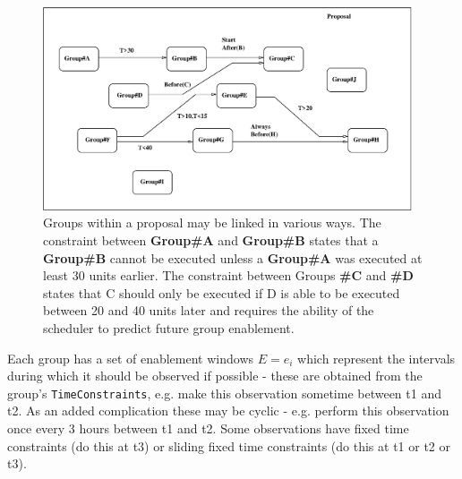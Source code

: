    \begin{figure}[h]
   \begin{center}
   \includegraphics[height=6cm]{figures/group_linking.eps}
   \end{center}
  
   \caption[Group Linking.] 
   {Groups within a proposal may be linked in various ways. The constraint between {\bf Group\#A} and {\bf Group\#B} states that a {\bf Group\#B} cannot be executed unless a {\bf Group\#A} was executed at least 30 units earlier. The constraint between Groups {\bf \#C} and {\bf \#D} states that C should only be executed if D is able to be executed between 20 and 40 units later and requires the ability of the scheduler to predict future group enablement.}
   \label{fig:group-linking} 
   \end{figure} 


Each group has a set of enablement windows $E={e_i}$ which represent the intervals during which it should be observed if possible - these are obtained from the group's \texttt{TimeConstraints}, e.g. make this observation sometime between t1 and t2. As an added complication these may be cyclic - e.g. perform this observation once every 3 hours between t1 and t2. Some observations have fixed time constraints (do this at t3) or sliding fixed time constraints (do this at t1 or t2 or t3). 

